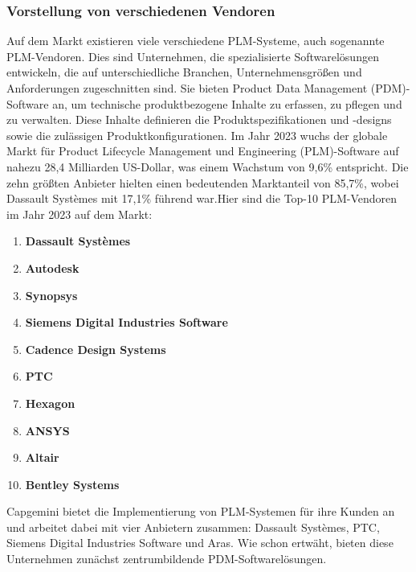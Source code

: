 \documentclass[a4paper, 12pt]{scrartcl}
\begin{document}
	\subsubsection{Vorstellung von verschiedenen Vendoren}
Auf dem Markt existieren viele verschiedene PLM-Systeme, auch sogenannte PLM-Vendoren. Dies sind Unternehmen, die spezialisierte Softwarelösungen entwickeln, die auf unterschiedliche Branchen, Unternehmensgrößen und Anforderungen zugeschnitten sind. Sie bieten Product Data Management (PDM)-Software an, um technische produktbezogene Inhalte zu erfassen, zu pflegen und zu verwalten. Diese Inhalte definieren die Produktspezifikationen und -designs sowie die zulässigen Produktkonfigurationen\cite{PLM1}.
Im Jahr 2023 wuchs der globale Markt für Product Lifecycle Management und Engineering (PLM)-Software auf nahezu 28,4 Milliarden US-Dollar, was einem Wachstum von 9,6\% entspricht. Die zehn größten Anbieter hielten einen bedeutenden Marktanteil von 85,7\%, wobei Dassault Systèmes mit 17,1\% führend war.Hier sind die Top-10 PLM-Vendoren im Jahr 2023 auf dem Markt\cite{Top10PLMVendoren}:
	\begin{enumerate}
		\item \textbf{Dassault Systèmes} 
		\item \textbf{Autodesk}
		\item \textbf{Synopsys}
		\item \textbf{Siemens Digital Industries Software}
		\item \textbf{Cadence Design Systems}
		\item \textbf{PTC}
		\item \textbf{Hexagon}
		\item \textbf{ANSYS}
		\item \textbf{Altair}
		\item \textbf{Bentley Systems}
	\end{enumerate}
	Capgemini bietet die Implementierung von PLM-Systemen für ihre Kunden an und arbeitet dabei mit vier Anbietern zusammen: Dassault Systèmes, PTC, Siemens Digital Industries Software und Aras. Wie schon ertwäht, bieten diese Unternehmen zunächst zentrumbildende PDM-Softwarelösungen.
\end{document}
